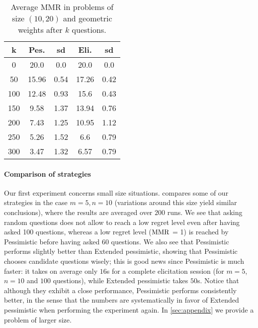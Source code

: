 \documentclass{article}
\begin{document}
\begin{table}[t]
	\caption{Average MMR in problems of size $(10, 20)$ and geometric weights after $k$ questions.}
	\label{tab:geometricWeights}
	\begin{tabular}{S[table-figures-integer=3, table-figures-decimal=0]S[table-number-alignment = right]@{ ± }S[table-number-alignment = left, table-figures-integer=1]S[table-number-alignment = right]@{ ± }S[table-number-alignment = left, table-figures-integer=1]}
		\toprule
		{k} & {Pes.} & {sd} & {Eli.} & {sd} \\
			&20.0	&0.0	&20.0	&0.0\\
		50	&15.96	&0.54	&17.26	&0.42\\
		100	&12.48	&0.93	&15.6	&0.43\\
		150	&9.58	&1.37	&13.94	&0.76\\
		200	&7.43	&1.25	&10.95	&1.12\\
		250	&5.26	&1.52	&6.6	&0.79\\
		300	&3.47	&1.32	&6.57	&0.79\\
		\bottomrule
	\end{tabular}
\end{table}
\paragraph{Comparison of strategies}
Our first experiment concerns small size situations.
 compares some of our strategies in the case $m = 5, n = 10$ (variations around this size yield similar conclusions), where the results are averaged over $200$ runs.
We see that asking random questions does not allow to reach a low regret level even after having asked 100 questions, whereas a low regret level ($\operatorname{MMR}$ = 1) is reached by Pessimistic before having asked 60 questions.
We also see that Pessimistic performs slightly better than Extended pessimistic, showing that Pessimistic chooses candidate questions wisely; this is good news since Pessimistic is much faster: it takes on average only $16$s for a complete elicitation session (for $m = 5$, $n = 10$ and $100$ questions), while Extended pessimistic takes $50$s. Notice that although they exhibit a close performance, Pessimistic performs consistently better, in the sense that the numbers are systematically in favor of Extended pessimistic when performing the experiment again.
In \cref{sec:appendix} we provide a problem of larger size.
\end{document}
